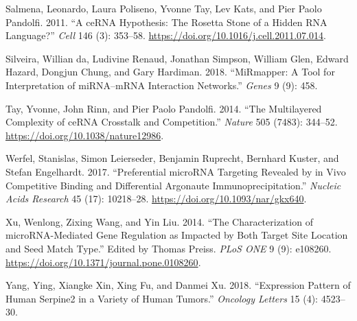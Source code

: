 \documentclass[]{article}
\begin{document}
\leavevmode\hypertarget{ref-salmena_cerna_2011}{}%
Salmena, Leonardo, Laura Poliseno, Yvonne Tay, Lev Kats, and Pier Paolo
Pandolfi. 2011. ``A ceRNA Hypothesis: The Rosetta Stone of a Hidden RNA
Language?'' \emph{Cell} 146 (3): 353--58.
\url{https://doi.org/10.1016/j.cell.2011.07.014}.

\leavevmode\hypertarget{ref-da2018mirmapper}{}%
Silveira, Willian da, Ludivine Renaud, Jonathan Simpson, William Glen,
Edward Hazard, Dongjun Chung, and Gary Hardiman. 2018. ``MiRmapper: A
Tool for Interpretation of miRNA--mRNA Interaction Networks.''
\emph{Genes} 9 (9): 458.

\leavevmode\hypertarget{ref-tay_multilayered_2014}{}%
Tay, Yvonne, John Rinn, and Pier Paolo Pandolfi. 2014. ``The
Multilayered Complexity of ceRNA Crosstalk and Competition.''
\emph{Nature} 505 (7483): 344--52.
\url{https://doi.org/10.1038/nature12986}.

\leavevmode\hypertarget{ref-werfel_preferential_2017}{}%
Werfel, Stanislas, Simon Leierseder, Benjamin Ruprecht, Bernhard Kuster,
and Stefan Engelhardt. 2017. ``Preferential microRNA Targeting Revealed
by in Vivo Competitive Binding and Differential Argonaute
Immunoprecipitation.'' \emph{Nucleic Acids Research} 45 (17): 10218--28.
\url{https://doi.org/10.1093/nar/gkx640}.

\leavevmode\hypertarget{ref-xu_characterization_2014}{}%
Xu, Wenlong, Zixing Wang, and Yin Liu. 2014. ``The Characterization of
microRNA-Mediated Gene Regulation as Impacted by Both Target Site
Location and Seed Match Type.'' Edited by Thomas Preiss. \emph{PLoS ONE}
9 (9): e108260. \url{https://doi.org/10.1371/journal.pone.0108260}.

\leavevmode\hypertarget{ref-yang2018expression}{}%
Yang, Ying, Xiangke Xin, Xing Fu, and Danmei Xu. 2018. ``Expression
Pattern of Human Serpine2 in a Variety of Human Tumors.'' \emph{Oncology
Letters} 15 (4): 4523--30.
\end{document}
